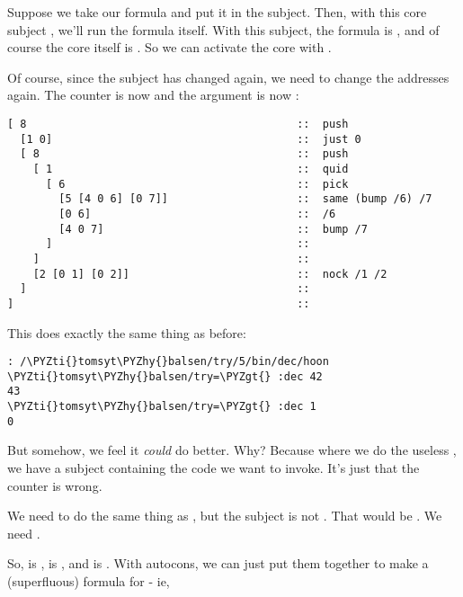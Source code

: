 Suppose we take our  formula and put it in the subject.  Then,
with this core subject , we'll run
the formula itself.  With this subject, the formula is , and
of course the core itself is .  So we can activate the core
with \kode{[2 [0 1] [0 2]]}.

Of course, since the subject has changed again, we need to change
the addresses again.  The counter is now  and the argument
is now :

\begin{framed_shaded}
\begin{Verbatim}[fontsize=\relsize{-2.5},commandchars=\\\{\}]
[ 8                                          ::  push
  [1 0]                                      ::  just 0
  [ 8                                        ::  push
    [ 1                                      ::  quid
      [ 6                                    ::  pick
        [5 [4 0 6] [0 7]]                    ::  same (bump /6) /7
        [0 6]                                ::  /6
        [4 0 7]                              ::  bump /7
      ]                                      :: 
    ]                                        :: 
    [2 [0 1] [0 2]]                          ::  nock /1 /2
  ]                                          :: 
]                                            :: 
\end{Verbatim}
\end{framed_shaded}
This does exactly the same thing as before:

\begin{framed_shaded}
\begin{Verbatim}[fontsize=\relsize{-2.5},commandchars=\\\{\}]
: /\PYZti{}tomsyt\PYZhy{}balsen/try/5/bin/dec/hoon
\PYZti{}tomsyt\PYZhy{}balsen/try=\PYZgt{} :dec 42
43
\PYZti{}tomsyt\PYZhy{}balsen/try=\PYZgt{} :dec 1
0
\end{Verbatim}
\end{framed_shaded}
But somehow, we feel it \emph{could} do better.  Why?  Because where
we do the useless \kode{[4 0 7]}, we have a subject containing the
code we want to invoke.  It's just that the counter is wrong.

We need to do the same thing as \kode{[2 [0 1] [0 2]}, but the subject
is not \kode{[0 1]}.  That would be .  We
need .

So,  is \kode{[0 2]},  is \kode{[0 6]}, and  is
\kode{[0 7]}.  With autocons, we can just put them together to make a
(superfluous) formula for  - ie,

